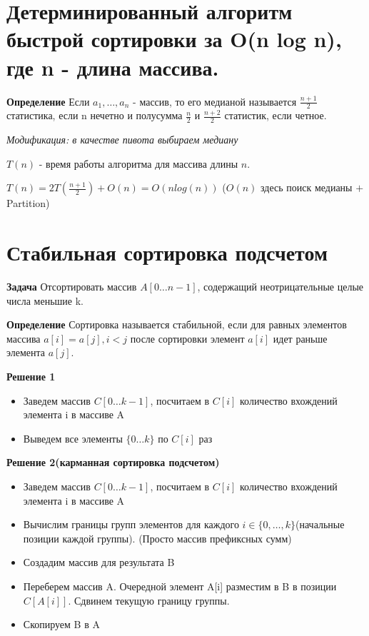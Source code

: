 \setcounter{section}{18}
\section{Детерминированный алгоритм быстрой сортировки за O(n log n), где n - длина массива.}

\noindent \textbf{Определение} Если $a_1, \dots, a_n$ - массив, то его медианой называется $\frac{n + 1}{2}$ статистика, если n нечетно и полусумма $\frac{n}{2}$ и $\frac{n + 2}{2}$ статистик, если четное.

\textit{Модификация: в качестве пивота выбираем медиану}



$T(n)$ - время работы алгоритма для массива длины $n$.

$T(n) = 2T(\frac{n + 1}{2}) + O(n) = O(nlog(n))$
($O(n)$ здесь поиск медианы $+$ Partition)

\setcounter{section}{19}
\section{Стабильная сортировка подсчетом}

\textbf{Задача} Отсортировать массив $A[0\ldots n-1]$, содержащий неотрицательные целые числа меньшие k.

\textbf{Определение} Сортировка называется стабильной, если для равных элементов массива $a[i] = a[j], i < j$ после сортировки элемент $a[i]$ идет раньше элемента $a[j]$.

\textbf{Решение 1}
\begin{itemize}
    \item Заведем массив $C[0\ldots k-1]$, посчитаем в $C[i]$ количество вхождений элемента i в массиве A
    \item Выведем все элементы $\{0\ldots k\}$ по $C[i]$ раз
\end{itemize}

\textbf{Решение 2(карманная сортировка подсчетом)}
\begin{itemize}
    \item Заведем массив $C[0\ldots k-1]$, посчитаем в $C[i]$ количество вхождений элемента i в массиве A
    \item Вычислим границы групп элементов для каждого $i \in \{0,\ldots,k\}$(начальные позиции каждой группы). (Просто массив префиксных сумм)
    \item Создадим массив для результата B
    \item Переберем массив A. Очередной элемент A[i] разместим в B в позиции $C[A[i]]$. Сдвинем текущую границу группы.
    \item Скопируем B в A
\end{itemize}

